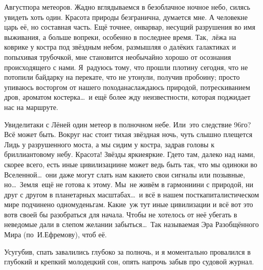 Август\mdash пора метеоров. Жадно вглядываемся в безоблачное ночное небо, силясь увидеть хоть один. Красота природы безгранична, думается мне. А человек\mdash не царь её, но составная часть. Ещё точнее, он\mdash варвар, несущий разрушения во имя выживания, а больше вопреки, особенно в последнее время. Так,~лёжа на коврике у костра под звёздным небом, размышляя о далёких галактиках и попыхивая трубочкой, мне становится необычайно хорошо от осознания происходящего с нами. Я~радуюсь тому, что прошли плотину сегодня, что не потопили байдарку на перекате, что не утонули, получив пробоину; просто упиваюсь восторгом от нашего похода\mdash наслаждаюсь природой, потрескиванием дров, ароматом костерка\ldots~и ещё более жду неизвестности, которая поджидает нас на маршруте.

Увидели\sdash таки с Лёней один метеор в полночном небе. Или~это следствие 96\sdash го? Всё может быть. Вокруг нас стоит тихая звёздная ночь, чуть слышно плещется Лидь у разрушенного моста, а мы сидим у костра, задрав головы к бриллиантовому небу. Красота! Звёзды яркие\sdash яркие. Где\sdash то там, далеко над нами, скорее всего, есть иные цивилизации\mdash не может ведь быть так, что мы одиноки во Вселенной\ldots~они даже могут слать нам какие\sdash то свои сигналы или позывные, но\ldots~Земля~ещё не готова к этому. Мы~не живём в гармонии\mdash ни с природой, ни друг с другом в планетарных масштабах\ldots~и всё в нашем посткапиталистическом мире подчинено одному\mdash деньгам. Какие~уж тут иные цивилизации и всё вот это вот\mdash в своей бы разобраться для начала. Чтобы не хотелось от неё убегать в неведомые дали в слепом желании забыться\ldots~Так называемая Эра Разобщённого Мира (по~И.Ефремову), чтоб её.

Усугубив, спать завалились глубоко за полночь, и я моментально провалился в глубокий и крепкий молодецкий сон, опять напрочь забыв про судовой журнал.

\begin{center}
\end{center}